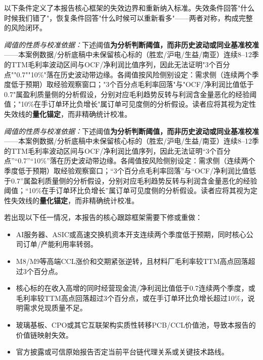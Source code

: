 以下条件定义了本报告核心框架的失效边界和重新纳入标准。失效条件回答"什么时候我们错了"，恢复条件回答"什么时候可以重新看多"——两者对称，构成完整的风险闭环。

\textit{阈值的性质与校准依据：}下述阈值\textbf{为分析判断阈值，而非历史波动或同业基准校准}——本案例数据/分析底稿中未保留核心标的（胜宏/沪电/生益/南亚）连续8--12季的TTM毛利率波动区间与OCF/净利润比值序列，因此无法证明"3个百分点""0.7""10\%"落在历史波动带边缘。各阈值按风险侧别设定：需求侧（连续两个季度低于预期）取经验观察窗口；"3个百分点毛利率回落"与"OCF/净利润比值低于0.7"属盈利质量侧的分析假设，分别对应毛利趋势反转与利润含金量恶化的经验阈值；"10\%在手订单环比负增长"属订单可见度侧的分析假设。读者应将其视为定性失效线的\textbf{量化锚定}，而非精确统计校准。

\textit{阈值的性质与校准依据：}下述阈值\textbf{为分析判断阈值，而非历史波动或同业基准校准}——本案例数据/分析底稿中未保留核心标的（胜宏/沪电/生益/南亚）连续8--12季的TTM毛利率波动区间与OCF/净利润比值序列，因此无法证明“3个百分点”“0.7”“10\%”落在历史波动带边缘。各阈值按风险侧别设定：需求侧（连续两个季度低于预期）取经验观察窗口；“3个百分点毛利率回落”与“OCF/净利润比值低于0.7”属盈利质量侧的分析假设，分别对应毛利趋势反转与利润含金量恶化的经验阈值；“10\%在手订单环比负增长”属订单可见度侧的分析假设。读者应将其视为定性失效线的\textbf{量化锚定}，而非精确统计校准。

\begin{riskbox}[失效条件]
若出现以下任一情况，本报告的核心跟踪框架需要下修或重做：
\begin{itemize}
  \item AI服务器、ASIC或高速交换机资本开支连续两个季度低于预期，同时核心公司订单/产能利用率转弱。
  \item M8/M9等高端CCL涨价和交期紧张逆转，且材料厂毛利率较TTM高点回落超过3个百分点。
  \item 核心标的在收入高增的同时经营现金流/净利润比值低于0.7连续两个季度，或毛利率较TTM高点回落超过3个百分点，或在手订单环比负增长超过10\%，说明需求兑现质量不足。
  \item 玻璃基板、CPO或其它互联架构实质性转移PCB/CCL价值池，导致本报告的价值链映射失效。
  \item 官方披露或可信原始报告否定当前平台链代理关系或关键技术路线。
\end{itemize}
\end{riskbox}

